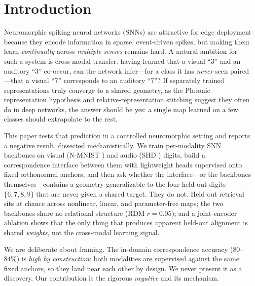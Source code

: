 \documentclass[conference]{IEEEtran}
\begin{document}
\section{Introduction}
Neuromorphic spiking neural networks (SNNs) are attractive for edge
deployment because they encode information in sparse, event-driven spikes,
but making them learn \emph{continually} across \emph{multiple senses}
remains hard. A natural ambition for such a system is cross-modal transfer:
having learned that a visual ``3'' and an auditory ``3'' co-occur, can the
network infer---for a class it has \emph{never} seen paired---that a visual
``7'' corresponds to an auditory ``7''? If separately trained representations
truly converge to a shared geometry, as the Platonic representation
hypothesis \cite{platonic} and relative-representation stitching
\cite{relreps} suggest they often do in deep networks, the answer should be
yes: a single map learned on a few classes should extrapolate to the rest.

This paper tests that prediction in a controlled neuromorphic setting and
reports a negative result, dissected mechanistically. We train per-modality
SNN backbones on visual (N-MNIST \cite{nmnist}) and audio (SHD \cite{shd})
digits, build a correspondence interface between them with lightweight
heads supervised onto fixed orthonormal anchors, and then ask whether the
interface---or the backbones themselves---contains a geometry generalizable
to the four held-out digits $\{6,7,8,9\}$ that are never given a shared
target. They do not. Held-out retrieval sits at chance across nonlinear,
linear, and parameter-free maps; the two backbones share no relational
structure (RDM $r=0.05$); and a joint-encoder ablation shows that the only
thing that produces apparent held-out alignment is shared \emph{weights},
not the cross-modal learning signal.

We are deliberate about framing. The in-domain correspondence accuracy
($80$--$84\%$) is \emph{high by construction}: both modalities are
supervised against the same fixed anchors, so they land near each other by
design. We never present it as a discovery. Our contribution is the rigorous
\emph{negative} and its mechanism.
\end{document}
